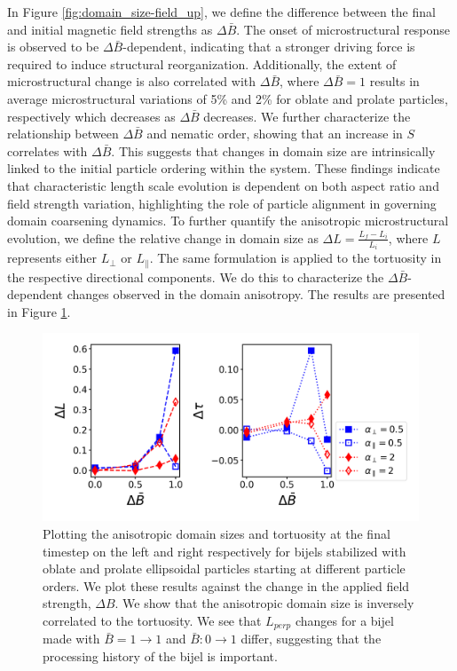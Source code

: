 In Figure \ref{fig:domain_size-field_up}, we define the difference
between the final and initial magnetic field strengths as
\(\Delta \bar{B}\). The onset of microstructural response is observed to
be \(\Delta \bar{B}\)-dependent, indicating that a stronger driving
force is required to induce structural reorganization. Additionally, the
extent of microstructural change is also correlated with
\(\Delta \bar{B}\), where \(\Delta \bar{B} = 1\) results in average
microstructural variations of 5\% and 2\% for oblate and prolate
particles, respectively which decreases as \(\Delta \bar{B}\) decreases.
We further characterize the relationship between \(\Delta \bar{B}\) and
nematic order, showing that an increase in \(S\) correlates with
\(\Delta \bar{B}\). This suggests that changes in domain size are
intrinsically linked to the initial particle ordering within the system.
These findings indicate that characteristic length scale evolution is
dependent on both aspect ratio and field strength variation,
highlighting the role of particle alignment in governing domain
coarsening dynamics. To further quantify the anisotropic microstructural
evolution, we define the relative change in domain size as
\(\Delta L = \frac{L_{f} - L_{i}}{L_{i}}\), where \(L\) represents
either \(L_{\perp}\) or \(L_{\parallel}\). The same formulation is
applied to the tortuosity in the respective directional components. We
do this to characterize the \(\Delta \bar{B}\)-dependent changes
observed in the domain anisotropy. The results are presented in Figure
\ref{fig:domain_size_aniso-field_up}.

\begin{figure} 
\centering 
\includegraphics[scale = 0.5]{../figures/results/paper2/domain_size_aniso-field_up.png} 
\caption{Plotting the anisotropic domain sizes and tortuosity at the final timestep on the left and right respectively for bijels stabilized with oblate and prolate ellipsoidal particles starting at different particle orders. We plot these results against the change in the applied field strength, $\Delta B$. We show that the anisotropic domain size is inversely correlated to the tortuosity. We see that $L_{perp}$ changes for a bijel made with $\bar{B} = 1 \rightarrow 1$ and $\bar{B}: 0 \rightarrow 1$ differ, suggesting that the processing history of the bijel is important.} 
\label{fig:domain_size_aniso-field_up} 
\end{figure}

